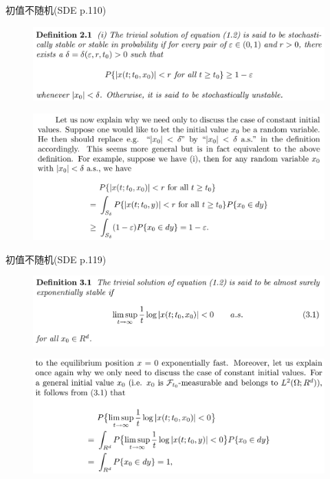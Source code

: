 \documentclass[10pt,aspectratio=43]{beamer}
\begin{document}
\begin{frame}{初值不随机(SDE p.110)}
\begin{figure}
\centering
\includegraphics[width=\linewidth]{../figures/x1}
\end{figure}
\vspace{-1cm}
\begin{figure}
\centering
\includegraphics[width=\linewidth]{../figures/x2}
\end{figure}
\end{frame}

\begin{frame}{初值不随机(SDE p.119)}
\begin{figure}
\centering
\includegraphics[width=\linewidth]{../figures/x3}
\end{figure}
\vspace{-1cm}
\begin{figure}
\centering
\includegraphics[width=\linewidth]{../figures/x4}
\end{figure}
\end{frame}
\end{document}
